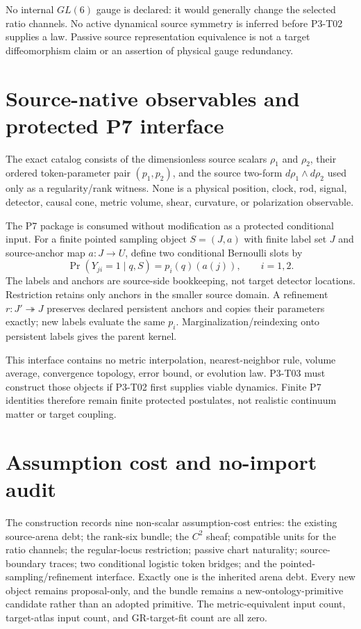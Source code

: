 \documentclass[11pt]{article}
\begin{document}
No internal $GL(6)$ gauge is declared: it would generally change the selected
ratio channels.  No active dynamical source symmetry is inferred before
P3-T02 supplies a law.  Passive source representation equivalence is not a
target diffeomorphism claim or an assertion of physical gauge redundancy.

\section{Source-native observables and protected P7 interface}

The exact catalog consists of the dimensionless source scalars $\rho_1$ and
$\rho_2$, their ordered token-parameter pair $(p_1,p_2)$, and the source
two-form $d\rho_1\wedge d\rho_2$ used only as a regularity/rank witness.  None
is a physical position, clock, rod, signal, detector, causal cone, metric
volume, shear, curvature, or polarization observable.

The P7 package is consumed without modification as a protected conditional
input.  For a finite pointed sampling object $S=(J,a)$ with finite label set
$J$ and source-anchor map $a:J\to U$, define two conditional Bernoulli slots
by
\[
 \Pr(Y_{ji}=1\mid q,S)=p_i(q)(a(j)),\qquad i=1,2.
\]
The labels and anchors are source-side bookkeeping, not target detector
locations.  Restriction retains only anchors in the smaller source domain.
A refinement $r:J'\twoheadrightarrow J$ preserves declared persistent anchors
and copies their parameters exactly; new labels evaluate the same $p_i$.
Marginalization/reindexing onto persistent labels gives the parent kernel.

This interface contains no metric interpolation, nearest-neighbor rule,
volume average, convergence topology, error bound, or evolution law.  P3-T03
must construct those objects if P3-T02 first supplies viable dynamics.  Finite
P7 identities therefore remain finite protected postulates, not realistic
continuum matter or target coupling.

\section{Assumption cost and no-import audit}

The construction records nine non-scalar assumption-cost entries: the
existing source-arena debt; the rank-six bundle; the $C^2$ sheaf; compatible
units for the ratio channels; the regular-locus restriction; passive chart
naturality; source-boundary traces; two conditional logistic token bridges;
and the pointed-sampling/refinement interface.  Exactly one is the inherited
arena debt.  Every new object remains proposal-only, and the bundle remains a
new-ontology-primitive candidate rather than an adopted primitive.  The
metric-equivalent input count, target-atlas input count, and GR-target-fit
count are all zero.
\end{document}
